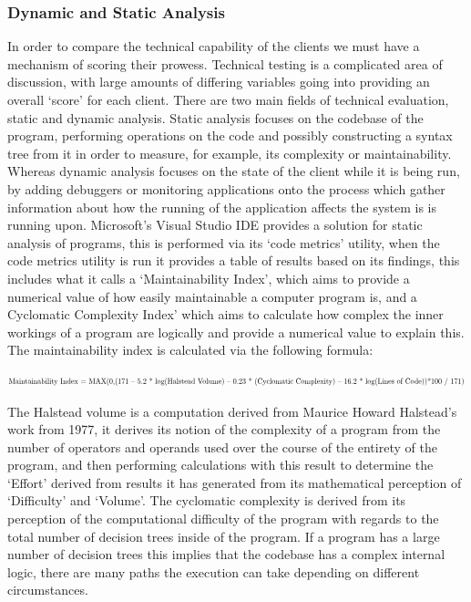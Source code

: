 \documentclass{article}
\begin{document}
	\subsubsection{Dynamic and Static Analysis}
	In order to compare the technical capability of the clients we must have a mechanism of scoring their prowess. Technical testing is a complicated area of discussion, with large amounts of differing variables going into providing an overall ‘score’ for each client. There are two main fields of technical evaluation, static and dynamic analysis. Static analysis focuses on the codebase of the program, performing operations on the code and possibly constructing a syntax tree from it in order to measure, for example, its complexity or maintainability. Whereas dynamic analysis focuses on the state of the client while it is being run, by adding debuggers or monitoring applications onto the process which gather information about how the running of the application affects the system is is running upon. Microsoft’s Visual Studio IDE provides a solution for static analysis of programs, this is performed via its ‘code metrics’ utility, when the code metrics utility is run it provides a table of results based on its findings, this includes what it calls a ‘Maintainability Index’, which aims to provide a numerical value of how easily maintainable a computer program is, and a Cyclomatic Complexity Index’ which aims to calculate how complex the inner workings of a program are logically and provide a numerical value to explain this. The maintainability index is calculated via the following formula: 
	\begin{center}
	\begin{equation}
	\resizebox{1.1\hsize}{!}{Maintainability Index = MAX(0,(171 – 5.2 * log(Halstead Volume) – 0.23 * (Cyclomatic Complexity) – 16.2 * log(Lines of Code))*100 / 171)}
	\end{equation}
	\end{center}
	
	The Halstead volume is a computation derived from Maurice Howard Halstead’s work from 1977, it derives its notion of the complexity of a program from the number of operators and operands used over the course of the entirety of the program, and then performing calculations with this result to determine the ‘Effort’ derived from results it has generated from its mathematical perception of ‘Difficulty’ and ‘Volume’. The cyclomatic complexity is derived from its perception of the computational difficulty of the program with regards to the total number of decision trees inside of the program. If a program has a large number of decision trees this implies that the codebase has a complex internal logic, there are many paths the execution can take depending on different circumstances.
	
\end{document}
